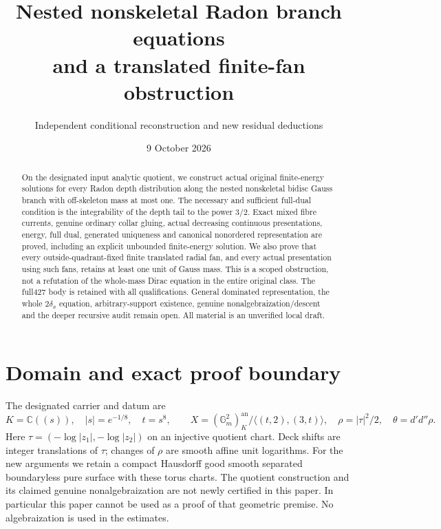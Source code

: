 \documentclass[11pt]{article}
\title{Nested nonskeletal Radon branch equations\\and a translated finite-fan obstruction}
\author{Independent conditional reconstruction and new residual deductions}
\date{9 October 2026}
\newcommand{\DD}{d'd''}
\begin{document}
\maketitle
\begin{abstract}
On the designated input analytic quotient, we construct actual original
finite-energy solutions for every Radon depth distribution along the nested
nonskeletal bidisc Gauss branch with off-skeleton mass at most one.
The necessary and sufficient full-dual condition is the integrability of
the depth tail to the power $3/2$. Exact mixed fibre currents, genuine
ordinary collar gluing, actual decreasing continuous presentations, energy,
full dual, generated uniqueness and canonical nonordered representation
are proved, including an explicit unbounded finite-energy solution.
We also prove that every outside-quadrant-fixed finite translated radial
fan, and every actual presentation using such fans, retains at least one
unit of Gauss mass. This is a scoped obstruction, not a refutation of the
whole-mass Dirac equation in the entire original class.
The full427 body is retained with all qualifications. General dominated
representation, the whole $2\delta_x$ equation, arbitrary-support existence,
genuine nonalgebraization/descent and the deeper recursive audit remain
open. All material is an unverified local draft.
\end{abstract}

\section{Domain and exact proof boundary}
The designated carrier and datum are
\[
 K=\mathbb C((s)),\quad |s|=e^{-1/8},\quad t=s^8,\qquad
 X=(\mathbb G_m^2)^{\mathrm{an}}_K/\langle(t,2),(3,t)\rangle,
 \quad \rho=|\tau|^2/2,\quad\theta=\DD\rho.
\]
Here $\tau=(-\log|z_1|,-\log|z_2|)$ on an injective quotient
chart. Deck shifts are integer translations of $\tau$; changes of
$\rho$ are smooth affine unit logarithms. For the new arguments we
retain a compact Hausdorff good smooth separated boundaryless pure
surface with these torus charts. The quotient construction and its
claimed genuine nonalgebraization are not newly certified in this paper.
In particular this paper cannot be used as a proof of that geometric
premise. No algebraization is used in the estimates.
\end{document}
